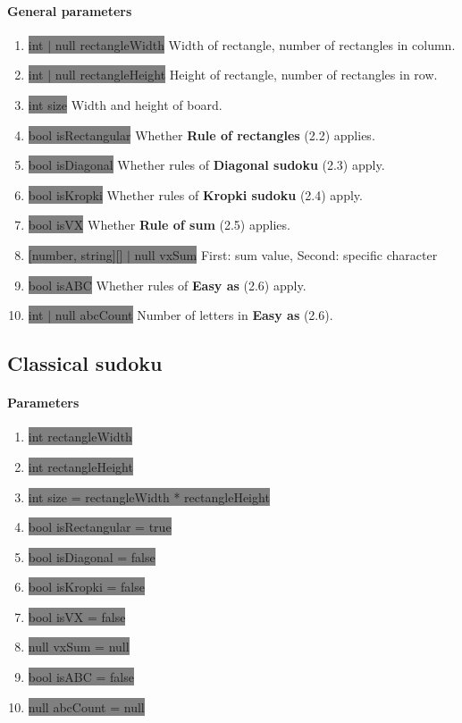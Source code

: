 \documentclass{report}
\begin{document}
\paragraph{General parameters}
\begin{enumerate}
    \item[] \colorbox{gray}{int $\vert$ null rectangleWidth} Width of rectangle, number of rectangles in column.
    \item[] \colorbox{gray}{int $\vert$ null rectangleHeight} Height of rectangle, number of rectangles in row.
    \item[] \colorbox{gray}{int size} Width and height of board.
    \item[] \colorbox{gray}{bool isRectangular} Whether \textbf{Rule of rectangles} (2.2) applies.
    \item[] \colorbox{gray}{bool isDiagonal} Whether rules of \textbf{Diagonal sudoku} (2.3) apply.
    \item[] \colorbox{gray}{bool isKropki} Whether rules of \textbf{Kropki sudoku} (2.4) apply.
    \item[] \colorbox{gray}{bool isVX} Whether \textbf{Rule of sum} (2.5) applies.
    \item[] \colorbox{gray}{[number, string][] $\vert$ null vxSum} First: sum value, Second: specific character
    \item[] \colorbox{gray}{bool isABC} Whether rules of \textbf{Easy as} (2.6) apply.
    \item[] \colorbox{gray}{int $\vert$ null abcCount} Number of letters in \textbf{Easy as} (2.6).
\end{enumerate}

\subsection{Classical sudoku}

\paragraph{Parameters}
\begin{enumerate}
    \item[] \colorbox{gray}{int rectangleWidth}
    \item[] \colorbox{gray}{int rectangleHeight}
    \item[] \colorbox{gray}{int size = rectangleWidth * rectangleHeight}
    \item[] \colorbox{gray}{bool isRectangular = true}
    \item[] \colorbox{gray}{bool isDiagonal = false}
    \item[] \colorbox{gray}{bool isKropki = false}
    \item[] \colorbox{gray}{bool isVX = false}
    \item[] \colorbox{gray}{null vxSum = null}
    \item[] \colorbox{gray}{bool isABC = false}
    \item[] \colorbox{gray}{null abcCount = null}
\end{enumerate}
\end{document}
